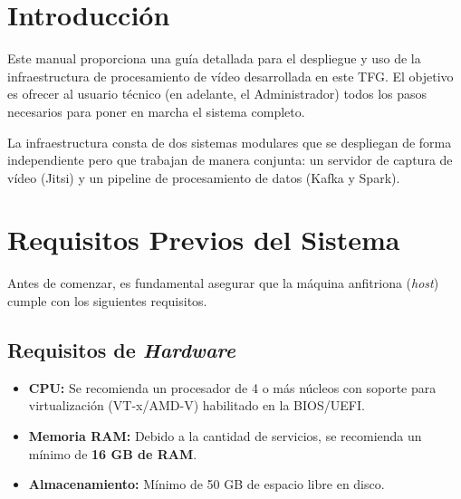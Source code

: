 \label{apendice:manual_usuario}

\section{Introducción}
\label{sec:manual_intro}
Este manual proporciona una guía detallada para el despliegue y uso de la infraestructura de procesamiento de vídeo desarrollada en este TFG. El objetivo es ofrecer al usuario técnico (en adelante, el Administrador) todos los pasos necesarios para poner en marcha el sistema completo.

La infraestructura consta de dos sistemas modulares que se despliegan de forma independiente pero que trabajan de manera conjunta: un servidor de captura de vídeo (Jitsi) y un pipeline de procesamiento de datos (Kafka y Spark).

\section{Requisitos Previos del Sistema}
\label{sec:manual_requisitos}
Antes de comenzar, es fundamental asegurar que la máquina anfitriona (\textit{host}) cumple con los siguientes requisitos.

\subsection{Requisitos de \textit{Hardware}}
\begin{itemize}
    \item \textbf{CPU:} Se recomienda un procesador de 4 o más núcleos con soporte para virtualización (VT-x/AMD-V) habilitado en la BIOS/UEFI.
    \item \textbf{Memoria RAM:} Debido a la cantidad de servicios, se recomienda un mínimo de \textbf{16 GB de RAM}.
    \item \textbf{Almacenamiento:} Mínimo de 50 GB de espacio libre en disco.
\end{itemize}

